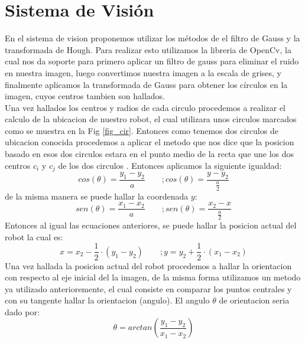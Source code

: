 \section{Sistema de Visi\'on}
En el sistema de vision proponemos utilizar los m\'etodos de el filtro de Gauss y la transformada de Hough. Para realizar esto utilizamos la libreria de OpenCv, la cual nos da soporte para primero aplicar un filtro de gauss para eliminar el ruido en nuestra imagen, luego convertimos nuestra imagen a la escala de grises, y finalmente aplicamos la transformada de Gauss para obtener los c\'irculos en la imagen, cuyos centros tambien son hallados.\\
Una vez hallados los centros y radios de cada circulo procedemos a realizar el calculo de la ubicacion de nuestro robot, el cual utilizara unos circulos marcados como se muestra en la Fig  \ref{fig_cir}. Entonces como tenemos dos circulos de ubicacion conocida procedemos a aplicar el metodo  que nos dice que la posicion basado en esos dos circulos estara en el punto medio de la recta que une los dos centros  $c_i$ y $c_j$ de los dos circulos \cite{kelson_glo}. Entonces aplicamos la siguiente igualdad:
\begin{equation}
cos(\theta)=\frac{y_1-y_2}{a} \qquad; cos(\theta)=\frac{y-y_2}{\frac{a}{2}}
\end{equation}
de la misma manera se puede hallar la coordenada $y$:
\begin{equation}
sen(\theta)=\frac{x_1-x_2}{a} \qquad; sen(\theta)=\frac{x_2-x}{\frac{a}{2}}
\end{equation}
Entonces al igual las ecuaciones anteriores, se puede hallar la posicion actual del robot la cual es:
\begin{equation}
x=x_2-\frac{1}{2}\cdot ({y_1-y_2} )\qquad ; y=y_2+ \frac{1}{2}\cdot( {x_1-x_2})
\end{equation}
Una vez hallada la posicion actual del robot procedemos a hallar la orientacion con respecto al eje inicial del la imagen, de la misma forma utilizamos un metodo ya utilizado anterioremente,  el cual consiste en comparar los puntos centrales y con su tangente hallar la orientacion (angulo)\cite{kelson_glo}. El angulo $\theta$ de orientacion seria dado por:
\begin{equation}
\theta=arctan(\frac{y_1-y_2}{x_1-x_2} )
\end{equation}


